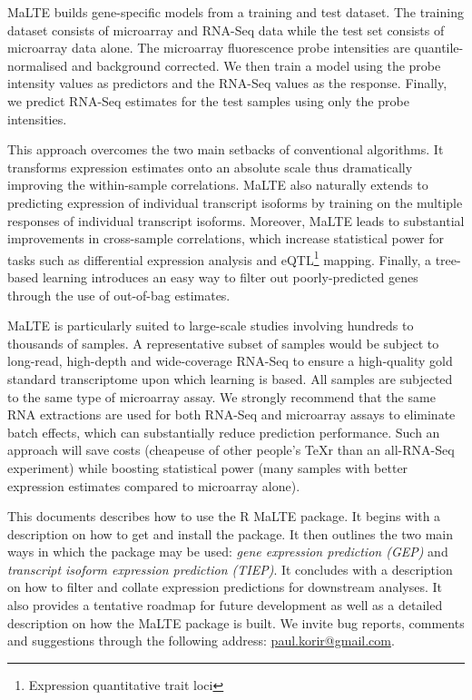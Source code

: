 \documentclass[a4paper,12pt]{article}
\begin{document}
\textsf{MaLTE} builds gene-specific models from a training and test dataset. The training dataset consists of microarray and RNA-Seq data while the test set consists of microarray data alone. The microarray fluorescence probe intensities are quantile-normalised and background corrected. We then train a model using the probe intensity values as predictors and the RNA-Seq values as the response. Finally, we predict RNA-Seq estimates for the test samples using only the probe intensities.

This approach overcomes the two main setbacks of conventional algorithms. It transforms expression estimates onto an absolute scale thus dramatically improving the within-sample correlations. \textsf{MaLTE} also naturally extends to predicting expression of individual transcript isoforms by training on the multiple responses of individual transcript isoforms. Moreover, \textsf{MaLTE} leads to substantial improvements in cross-sample correlations, which increase statistical power for tasks such as differential expression analysis and eQTL\footnote{Expression quantitative trait loci} mapping. Finally, a tree-based learning introduces an easy way to filter out poorly-predicted genes through the use of out-of-bag estimates.

\textsf{MaLTE} is particularly suited to large-scale studies involving hundreds to thousands of samples. A representative subset of samples would be subject to long-read, high-depth and wide-coverage RNA-Seq to ensure a high-quality gold standard transcriptome upon which learning is based. All samples are subjected to the same type of microarray assay. We strongly recommend that the same RNA extractions are used for both RNA-Seq and microarray assays to eliminate batch effects, which can substantially reduce prediction performance. Such an approach will save costs (cheapeuse of other people's TeXr than an all-RNA-Seq experiment) while boosting statistical power (many samples with better expression estimates compared to microarray alone).

This documents describes how to use the \textsf{R} \textsf{MaLTE} package. It begins with a description on how to get and install the package. It then outlines the two main ways in which the package may be used: \textit{gene expression prediction (GEP)} and \textit{transcript isoform expression prediction (TIEP)}. It concludes with a description on how to filter and collate expression predictions for downstream analyses. It also provides a tentative roadmap for future development as well as a detailed description on how the \textsf{MaLTE} package is built. We invite bug reports, comments and suggestions through the following address: \href{mailto:paul.korir@gmail.com}{paul.korir@gmail.com}.
\end{document}
